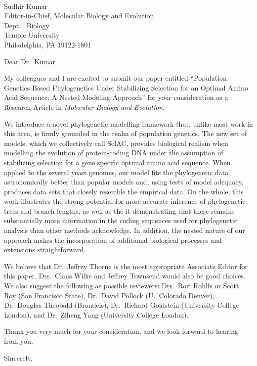 \documentclass[11pt,letterpaper]{letter}
\begin{document}
\begin{letter}{
\ \\
Sudhir Kumar\\
Editor-in-Chief, Molecular Biology and Evolution\\
Dept.~ Biology\\
Temple University\\
Philadelphia, PA 19122-1801 }


\opening{Dear Dr.~Kumar}

My colleagues and I are excited to submit our paper entitled ``Population Genetics Based Phylogenetics Under Stabilizing Selection for an Optimal Amino Acid Sequence: A Nested Modeling Approach'' for your consideration as a Research Article in \emph{Molecular Biology and Evolution}.

We introduce a novel phylogenetic modelling framework that, unlike most work in this area, is firmly grounded in the realm of population genetics. 
The new set of models, which we collectively call SelAC, provides biological realism when modelling the evolution of protein-coding DNA under the assumption of stabilizing selection for a gene specific optimal amino acid sequence. 
When applied to the several yeast genomes, our model fits the phylogenetic data astronomically better than popular models and, using tests of model adequacy,  produces data sets that closely resemble the empirical data. 
On the whole, this work illustrates the strong potential for more accurate inference of phylogenetic trees and branch lengths, as well as the it demonstrating that there remains substantially more information in the coding sequences used for phylogenetic analysis than other methods acknowledge.
In addition, the nested nature of our approach makes the incorporation of additional biological processes and extensions straightforward. 

We believe that Dr.~Jeffrey Thorne is the most appropriate Associate Editor for this paper. Drs.~Claus Wilke and Jeffrey Townsend would also be good choices. 
We also suggest the following as possible reviewers: Drs.~Rori Rohlfs or Scott Roy (San Francisco State), Dr.~David Pollock (U.~Colorado Denver), Dr.~Douglas Theobald (Brandeis), Dr.~Richard Goldstein (University College London), and Dr.~Ziheng Yang (University College London).

Thank you very much for your consideration, and we look forward to hearing from you.


\closing{Sincerely,}
\end{letter}
\end{document}
